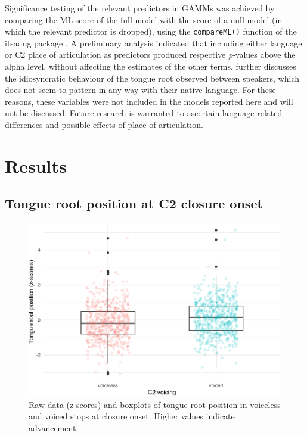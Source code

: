 \documentclass[preprint]{JASAnew}
\begin{document}
Significance testing of the relevant predictors in GAMMs was achieved by
comparing the ML score of the full model with the score of a null model
(in which the relevant predictor is dropped), using the
\texttt{compareML()} function of the itsadug package
\citep{van-rij2017}. A preliminary analysis indicated that including
either language or C2 place of articulation as predictors produced
respective \emph{p}-values above the alpha level, without affecting the
estimates of the other terms.  further discusses the
idiosyncratic behaviour of the tongue root observed between speakers,
which does not seem to pattern in any way with their native language.
For these reasons, these variables were not included in the models
reported here and will not be discussed. Future research is warranted to
ascertain language-related differences and possible effects of place of
articulation.

\hypertarget{results}{%
\section{Results}\label{results}}

\label{s:results}

\hypertarget{tongue-root-position-at-c2-closure-onset}{%
\subsection{Tongue root position at C2 closure
onset}\label{tongue-root-position-at-c2-closure-onset}}

\label{s:tra-lm}

\begin{figure}
\includegraphics[width=\linewidth]{./Figure3-1} \caption{Raw data (z-scores) and boxplots of tongue root position in voiceless and voiced stops at closure onset. Higher values indicate advancement.}\label{f:Figure3}
\end{figure}
\end{document}
